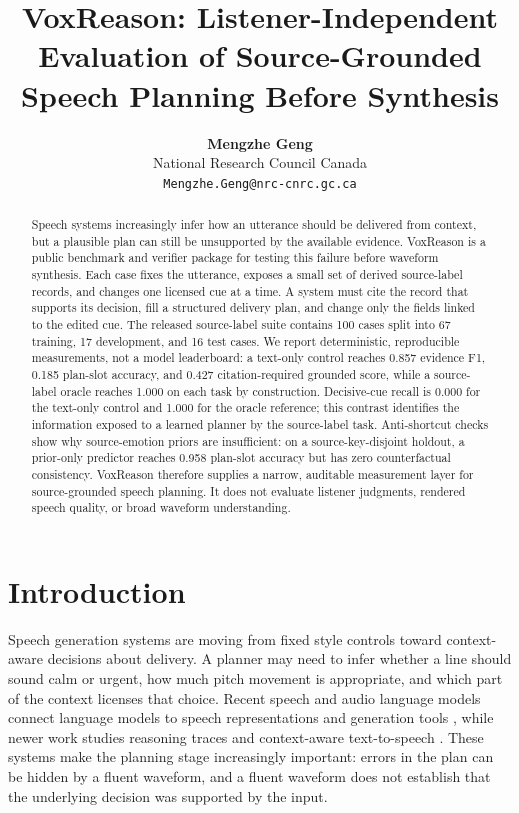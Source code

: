 \documentclass{article}
\title{VoxReason: Listener-Independent Evaluation of Source-Grounded Speech Planning Before Synthesis}
\author{\textbf{Mengzhe Geng}\\
National Research Council Canada\\
\texttt{Mengzhe.Geng@nrc-cnrc.gc.ca}}
\date{}
\begin{document}
\maketitle
{}
\fancyfoot[C]{\small\thepage}
\thispagestyle{fancy}

\begin{abstract}
Speech systems increasingly infer how an utterance should be delivered from context, but a plausible plan can still be unsupported by the available evidence. VoxReason is a public benchmark and verifier package for testing this failure before waveform synthesis. Each case fixes the utterance, exposes a small set of derived source-label records, and changes one licensed cue at a time. A system must cite the record that supports its decision, fill a structured delivery plan, and change only the fields linked to the edited cue. The released source-label suite contains 100 cases split into 67 training, 17 development, and 16 test cases. We report deterministic, reproducible measurements, not a model leaderboard: a text-only control reaches 0.857 evidence F1, 0.185 plan-slot accuracy, and 0.427 citation-required grounded score, while a source-label oracle reaches 1.000 on each task by construction. Decisive-cue recall is 0.000 for the text-only control and 1.000 for the oracle reference; this contrast identifies the information exposed to a learned planner by the source-label task. Anti-shortcut checks show why source-emotion priors are insufficient: on a source-key-disjoint holdout, a prior-only predictor reaches 0.958 plan-slot accuracy but has zero counterfactual consistency. VoxReason therefore supplies a narrow, auditable measurement layer for source-grounded speech planning. It does not evaluate listener judgments, rendered speech quality, or broad waveform understanding.
\end{abstract}

\section{Introduction}

Speech generation systems are moving from fixed style controls toward context-aware decisions about delivery. A planner may need to infer whether a line should sound calm or urgent, how much pitch movement is appropriate, and which part of the context licenses that choice. Recent speech and audio language models connect language models to speech representations and generation tools \cite{speechgpt,audiogpt}, while newer work studies reasoning traces and context-aware text-to-speech \cite{thinksound,cottts}. These systems make the planning stage increasingly important: errors in the plan can be hidden by a fluent waveform, and a fluent waveform does not establish that the underlying decision was supported by the input.
\end{document}

